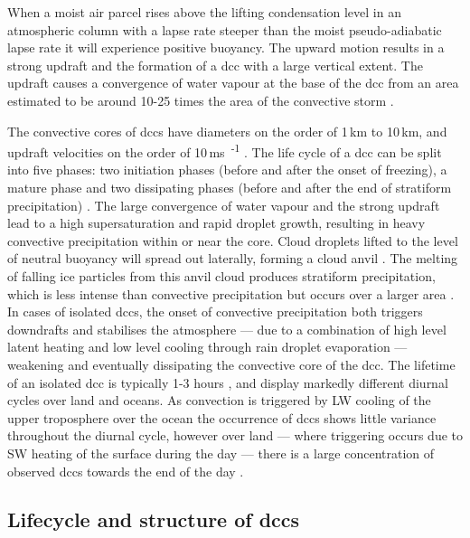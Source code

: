 When a moist air parcel rises above the lifting condensation level in an atmospheric column with a lapse rate steeper than the moist pseudo-adiabatic lapse rate it will experience positive buoyancy.
The upward motion results in a strong updraft and the formation of a \acrshort{dcc} with a large vertical extent.
The updraft causes a convergence of water vapour at the base of the \acrshort{dcc} from an area estimated to be around 10-25 times the area of the convective storm \citep{trenberth_changing_2003}.

The convective cores of \acrshort{dcc}s have diameters on the order of 1\,\unit{km} to 10\,\unit{km}, and updraft velocities on the order of 10\,\unit{ms\textsuperscript{-1}} \citep{weisman_mesoscale_2015}.
The life cycle of a \acrshort{dcc} can be split into five phases: two initiation phases (before and after the onset of freezing), a mature phase and two dissipating phases (before and after the end of stratiform precipitation) \citep{wall_life_2018}.
The large convergence of water vapour and the strong updraft lead to a high supersaturation and rapid droplet growth, resulting in heavy convective precipitation within or near the core.
Cloud droplets lifted to the level of neutral buoyancy will spread out laterally, forming a cloud anvil \citep{houze_chapter_2014}. 
The melting of falling ice particles from this anvil cloud produces stratiform precipitation, which is less intense than convective precipitation but occurs over a larger area \citep{houze_stratiform_1997}.
In cases of isolated \acrshort{dcc}s, the onset of convective precipitation both triggers downdrafts and stabilises the atmosphere --- due to a combination of high level latent heating and low level cooling through rain droplet evaporation --- weakening and eventually dissipating the convective core of the \acrshort{dcc}.
The lifetime of an isolated \acrshort{dcc} is typically 1-3 hours \citep{chen_diurnal_1997}, and display markedly different diurnal cycles over land and oceans. 
As convection is triggered by LW cooling of the upper troposphere over the ocean the occurrence of \acrshort{dcc}s shows little variance throughout the diurnal cycle, however over land --- where triggering occurs due to SW heating of the surface during the day --- there is a large concentration of observed \acrshort{dcc}s towards the end of the day \citep{taylor_evaluating_2017}.


\subsection{Lifecycle and structure of \acrshort{dcc}s}

